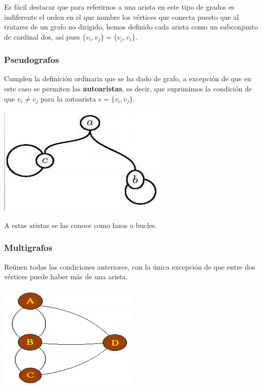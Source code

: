 \documentclass[10pt,a4paper,openright]{book}
\begin{document}
Es fácil destacar que para referirnos a una arista en este tipo de grados es indiferente el orden en el que nombre los vértices que conecta puesto que al tratarse de un grafo no dirigido, hemos definido cada arista como un subconjunto de cardinal dos, así pues $\{v_i,v_j\}=\{v_j,v_i\}$.

\subsubsection*{Pseudografos}
Cumplen la definición ordinaria que se ha dado de grafo, a excepción de que en este caso se permiten las \textbf{autoaristas}, es decir, que suprimimos la condición de que $v_i\neq v_j$ para la autoarista $e=\{v_i,v_j\}$.

\begin{center}
\includegraphics[scale=0.65]{pseudografo}
\end{center}

A estas aristas se las conoce como lazos o bucles.

\subsubsection*{Multigrafos}
Reúnen todas las condiciones anteriores, con la única excepción de que entre dos vértices puede haber más de una arista.

\begin{center}
\includegraphics[scale=0.65]{multigrafo}
\end{center}
\end{document}
